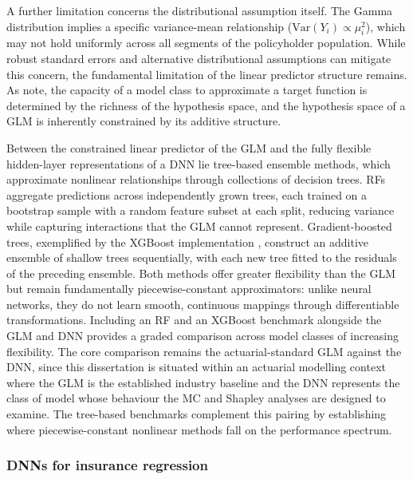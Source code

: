 A further limitation concerns the distributional assumption itself.
The Gamma distribution implies a specific variance-mean relationship
($\text{Var}(Y_i) \propto \mu_i^2$), which may not hold uniformly
across all segments of the policyholder population.  While robust standard errors and alternative
distributional assumptions can mitigate this concern, the fundamental
limitation of the linear predictor structure remains.  As
\citet{goodfellow2016deep} note, the capacity of a model class to
approximate a target function is determined by the richness of the
hypothesis space, and the hypothesis space of a GLM is inherently
constrained by its additive structure.

Between the constrained linear predictor of the GLM and the fully
flexible hidden-layer representations of a DNN lie
tree-based ensemble methods, which approximate nonlinear relationships
through collections of decision trees.  RFs
\citep{breiman2001random} aggregate predictions across independently
grown trees, each trained on a bootstrap sample with a random feature
subset at each split, reducing variance while capturing interactions
that the GLM cannot represent.  Gradient-boosted trees, exemplified by
the XGBoost implementation \citep{chen2016xgboost}, construct an
additive ensemble of shallow trees sequentially, with each new tree
fitted to the residuals of the preceding ensemble.  Both methods offer
greater flexibility than the GLM but remain fundamentally
piecewise-constant approximators: unlike neural networks, they do not
learn smooth, continuous mappings through differentiable transformations.
Including an RF and an XGBoost benchmark alongside the GLM and
DNN provides a graded comparison across model classes of increasing
flexibility.  The core comparison remains the actuarial-standard GLM
against the DNN, since this dissertation is situated within an actuarial
modelling context where the GLM is the established industry baseline and
the DNN represents the class of model whose behaviour the MC
and Shapley analyses are designed to examine.  The tree-based benchmarks
complement this pairing by establishing where piecewise-constant
nonlinear methods fall on the performance spectrum.

\subsubsection{DNNs for insurance regression}
\label{sec:dnn_intro}

